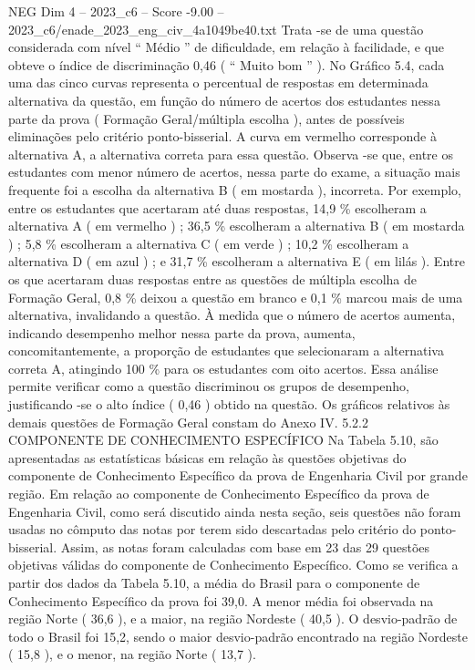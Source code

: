\begin{textsample}{NEG Dim 4 – 2023\_c6 – Score -9.00 – 2023\_c6/enade\_2023\_eng\_civ\_4a1049be40.txt}
Trata -se de uma questão considerada com nível “ Médio ” de dificuldade, em relação à facilidade, e que obteve o índice de discriminação 0,46 ( “ Muito bom ” ).
No Gráfico 5.4, cada uma das cinco curvas representa o percentual de respostas em determinada alternativa da questão, em função do número de acertos dos estudantes nessa parte da prova ( Formação Geral/múltipla escolha ), antes de possíveis eliminações pelo critério ponto-bisserial.
A curva em vermelho corresponde à alternativa A, a alternativa correta para essa questão.
Observa -se que, entre os estudantes com menor número de acertos, nessa parte do exame, a situação mais frequente foi a escolha da alternativa B ( em mostarda ), incorreta.
Por exemplo, entre os estudantes que acertaram até duas respostas, 14,9 \% escolheram a alternativa A ( em vermelho ) ; 36,5 \% escolheram a alternativa B ( em mostarda ) ; 5,8 \% escolheram a alternativa C ( em verde ) ; 10,2 \% escolheram a alternativa D ( em azul ) ; e 31,7 \% escolheram a alternativa E ( em lilás ).
Entre os que acertaram duas respostas entre as questões de múltipla escolha de Formação Geral, 0,8 \% deixou a questão em branco e 0,1 \% marcou mais de uma alternativa, invalidando a questão.
À medida que o número de acertos aumenta, indicando desempenho melhor nessa parte da prova, aumenta, concomitantemente, a proporção de estudantes que selecionaram a alternativa correta A, atingindo 100 \% para os estudantes com oito acertos.
Essa análise permite verificar como a questão discriminou os grupos de desempenho, justificando -se o alto índice ( 0,46 ) obtido na questão.
Os gráficos relativos às demais questões de Formação Geral constam do Anexo IV. 5.2.2 COMPONENTE DE CONHECIMENTO ESPECÍFICO Na Tabela 5.10, são apresentadas as estatísticas básicas em relação às questões objetivas do componente de Conhecimento Específico da prova de Engenharia Civil por grande região.
Em relação ao componente de Conhecimento Específico da prova de Engenharia Civil, como será discutido ainda nesta seção, seis questões não foram usadas no cômputo das notas por terem sido descartadas pelo critério do ponto-bisserial.
Assim, as notas foram calculadas com base em 23 das 29 questões objetivas válidas do componente de Conhecimento Específico.
Como se verifica a partir dos dados da Tabela 5.10, a média do Brasil para o componente de Conhecimento Específico da prova foi 39,0.
A menor média foi observada na região Norte ( 36,6 ), e a maior, na região Nordeste ( 40,5 ).
O desvio-padrão de todo o Brasil foi 15,2, sendo o maior desvio-padrão encontrado na região Nordeste ( 15,8 ), e o menor, na região Norte ( 13,7 ).

\end{textsample}
